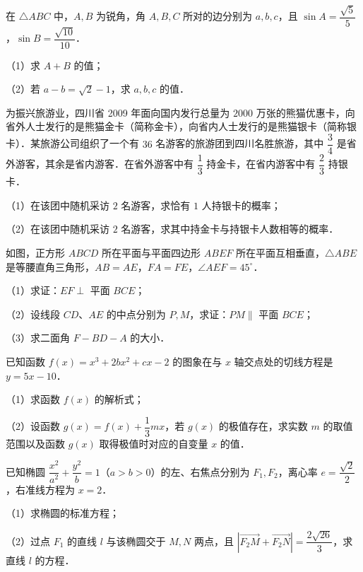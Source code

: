 \begin{question}
在 $\triangle ABC$ 中，$A,B$ 为锐角，角 $A,B,C$ 所对的边分别为 $a,b,c$，且 $\sin A=\dfrac{\sqrt5}{5}$，$\sin B=\dfrac{\sqrt{10}}{10}$．

（1）求 $A+B$ 的值；

（2）若 $a-b=\sqrt2-1$，求 $a,b,c$ 的值．

\end{question}
\begin{question}
为振兴旅游业，四川省 2009 年面向国内发行总量为 $2000$ 万张的熊猫优惠卡，向省外人士发行的是熊猫金卡（简称金卡），向省内人士发行的是熊猫银卡（简称银卡）．某旅游公司组织了一个有 $36$ 名游客的旅游团到四川名胜旅游，其中 $\dfrac34$ 是省外游客，其余是省内游客．在省外游客中有 $\dfrac13$ 持金卡，在省内游客中有 $\dfrac23$ 持银卡．

（1）在该团中随机采访 $2$ 名游客，求恰有 $1$ 人持银卡的概率；

（2）在该团中随机采访 $2$ 名游客，求其中持金卡与持银卡人数相等的概率．

\Needspace{0.4\textheight}
\end{question}
\begin{question}
如图，正方形 $ABCD$ 所在平面与平面四边形 $ABEF$ 所在平面互相垂直，$\triangle ABE$ 是等腰直角三角形，$AB=AE$，$FA=FE$，$\angle AEF=45^\circ$．
\nopagebreak[4]
\begin{center}\end{center}
\nopagebreak[4]
（1）求证：$EF\perp$ 平面 $BCE$；

（2）设线段 $CD$、$AE$ 的中点分别为 $P,M$，求证：$PM\parallel$ 平面 $BCE$；

（3）求二面角 $F-BD-A$ 的大小．

\end{question}
\begin{question}
已知函数 $f(x)=x^3+2bx^2+cx-2$ 的图象在与 $x$ 轴交点处的切线方程是 $y=5x-10$．

（1）求函数 $f(x)$ 的解析式；

（2）设函数 $g(x)=f(x)+\dfrac13mx$，若 $g(x)$ 的极值存在，求实数 $m$ 的取值范围以及函数 $g(x)$ 取得极值时对应的自变量 $x$ 的值．

\end{question}
\begin{question}
已知椭圆 $\dfrac{x^2}{a^2}+\dfrac{y^2}{b}=1$（$a>b>0$）的左、右焦点分别为 $F_1,F_2$，离心率 $e=\dfrac{\sqrt2}{2}$，右准线方程为 $x=2$．

（1）求椭圆的标准方程；

（2）过点 $F_1$ 的直线 $l$ 与该椭圆交于 $M,N$ 两点，且 $\left|\overrightarrow{F_2M}+\overrightarrow{F_2N}\right|=\dfrac{2\sqrt{26}}{3}$，求直线 $l$ 的方程．

\end{question}
